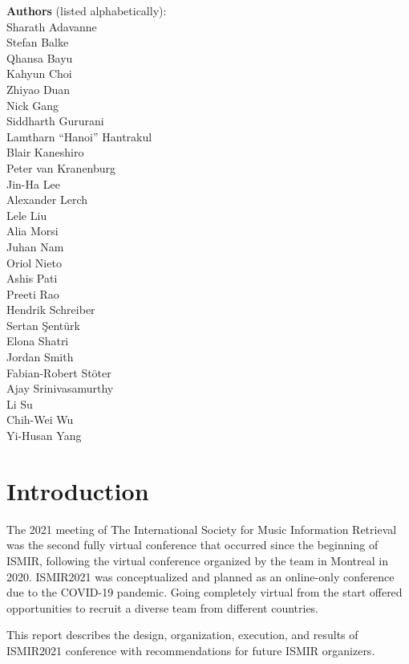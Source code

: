 \documentclass[%
10pt,								%
titlepage,						%
]
{scrartcl}
\begin{document}
\begin{titlepage}
    \vfill
    \textbf{Authors} (listed alphabetically):\\
    Sharath Adavanne\\
    Stefan Balke\\
    Qhansa Bayu\\
    Kahyun Choi\\
    Zhiyao Duan\\
    Nick Gang\\
    Siddharth Gururani\\
    Lamtharn ``Hanoi'' Hantrakul\\
    Blair Kaneshiro\\
    Peter van Kranenburg\\
    Jin-Ha Lee\\
    Alexander Lerch\\
    Lele Liu\\
    Alia Morsi\\
    Juhan Nam\\
    Oriol Nieto\\
    Ashis Pati\\
    Preeti Rao\\
    Hendrik Schreiber\\
    Sertan \c{S}ent\"urk\\
    Elona Shatri\\
    Jordan Smith\\
    Fabian-Robert Stöter\\
    Ajay Srinivasamurthy\\
    Li Su\\
    Chih-Wei Wu\\
    Yi-Husan Yang
\end{titlepage}

\tableofcontents		
\clearpage

\pagestyle{fancy}
\section{Introduction}
    The 2021 meeting of The International Society for Music Information Retrieval was the second fully virtual conference that occurred since the beginning of ISMIR, following the virtual conference organized by the team in Montreal in 2020. ISMIR2021 was conceptualized and planned as an online-only conference due to the COVID-19 pandemic. Going completely virtual from the start offered opportunities to recruit a diverse team from different countries. 

    This report describes the design, organization, execution, and results of ISMIR2021 conference with recommendations for future ISMIR organizers.  
\end{document}
